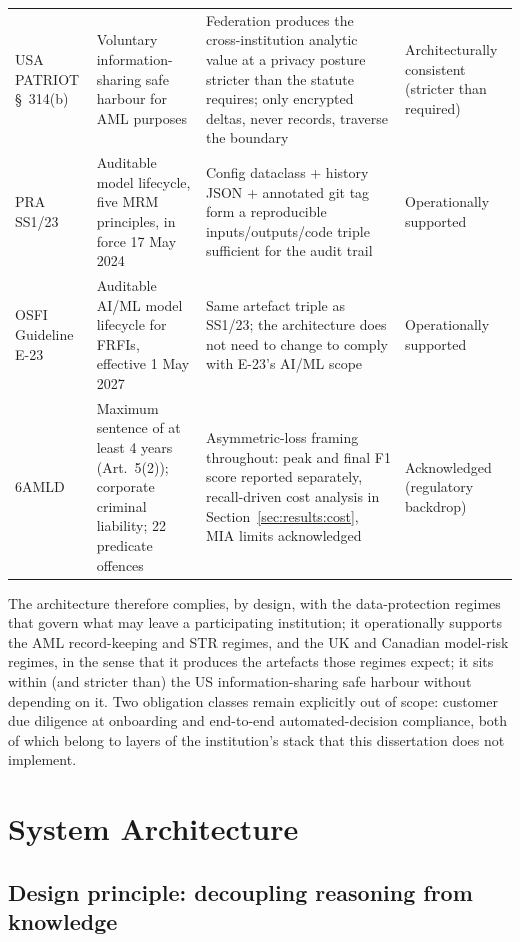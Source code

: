 \documentclass{report}
\begin{document}
\begin{table}[H]
\begin{tabularx}{\textwidth}{p{3.2cm} p{4.0cm} X p{2.4cm}}
\addlinespace
USA PATRIOT \S~314(b)~\cite{fincen314b} & Voluntary information-sharing safe harbour for AML purposes & Federation produces the cross-institution analytic value at a privacy posture stricter than the statute requires; only encrypted deltas, never records, traverse the boundary & Architecturally consistent (stricter than required) \\
\addlinespace
PRA SS1/23~\cite{prass123} & Auditable model lifecycle, five MRM principles, in force 17 May 2024 & Config dataclass + history JSON + annotated git tag form a reproducible inputs/outputs/code triple sufficient for the audit trail & Operationally supported \\
\addlinespace
OSFI Guideline E-23~\cite{osfie23} & Auditable AI/ML model lifecycle for FRFIs, effective 1 May 2027 & Same artefact triple as SS1/23; the architecture does not need to change to comply with E-23's AI/ML scope & Operationally supported \\
\addlinespace
6AMLD~\cite{eu6amld2018} & Maximum sentence of at least 4 years (Art.~5(2)); corporate criminal liability; 22 predicate offences & Asymmetric-loss framing throughout: peak and final F1 score reported separately, recall-driven cost analysis in Section~\ref{sec:results:cost}, MIA limits acknowledged & Acknowledged (regulatory backdrop) \\
\bottomrule
\end{tabularx}
\end{table}

The architecture therefore complies, by design, with the data-protection regimes that govern what may leave a participating institution; it operationally supports the AML record-keeping and STR regimes, and the UK and Canadian model-risk regimes, in the sense that it produces the artefacts those regimes expect; it sits within (and stricter than) the US information-sharing safe harbour without depending on it. Two obligation classes remain explicitly out of scope: customer due diligence at onboarding and end-to-end automated-decision compliance, both of which belong to layers of the institution's stack that this dissertation does not implement.

\section{System Architecture}
\label{sec:meth:arch}

\subsection{Design principle: decoupling reasoning from knowledge}
\end{document}
